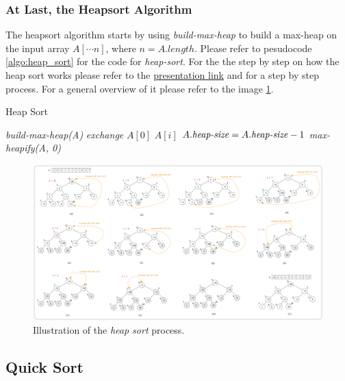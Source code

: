 \documentclass[a4paper,10pt]{article}
\begin{document}
\subsubsection{At Last, the Heapsort Algorithm}

The heapsort algorithm starts by using \textit{build-max-heap} to build a max-heap on the input array $A[ \cdots n]$, where $n = A.length$. Please refer to pesudocode \ref{algo:heap_sort} for the code for \textit{heap-sort}. For the the step by step on how the heap sort works please refer to the \href{https://docs.google.com/presentation/d/1OwlKmxGJ0ZByd2VlbXcm3qkIdtMeY7BJqHmPP0OF1bc/edit?usp=sharing}{presentation link} and for a step by step process. For a general overview of it please refer to the image \ref{fig:heap_sort}. 

\begin{algorithm}
    \caption{Heap Sort}
    \begin{algorithmic}[1]
            \State \textit{build-max-heap(A)}
                \State \textit{exchange} $A[0]$  $A[i]$
                \State $A.\text{\textit{heap-size}} = A.\text{\textit{heap-size}} - 1$
                \State \textit{max-heapify(A, 0)}
            \EndFor
        \EndFunction
    \end{algorithmic}
    \label{algo:heap_sort}
\end{algorithm}

\begin{figure}[ht]
\centering
\includegraphics[width=\linewidth]{figures/heap_sort.png}
\caption{Illustration of the \textit{heap sort} process.}
\label{fig:heap_sort}
\end{figure}

\subsection{Quick Sort}
\end{document}
